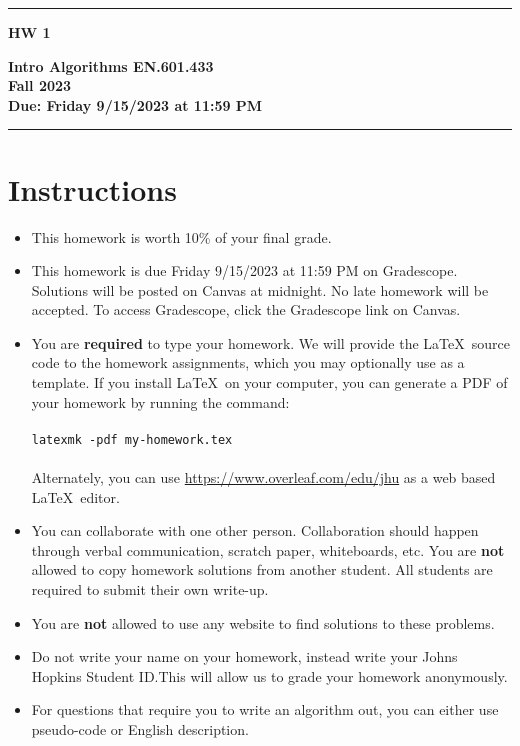 \documentclass[11pt]{article}
\begin{document}
\noindent\rule[2mm]{\textwidth}{1.5mm}
\noindent
\begin{minipage}{.3\textwidth}
  \vspace{-3mm}
  {\Huge\bf HW 1}
\end{minipage}\hfill\begin{minipage}{.5\textwidth}
\begin{flushright}
  {\bf Intro Algorithms EN.601.433 \\
  Fall 2023 \\
  Due: Friday 9/15/2023 at 11:59 PM}%
\vspace{3mm}
\end{flushright}
\end{minipage}
\noindent\rule{\textwidth}{1.5mm}

\section*{Instructions}

\begin{itemize}
\item This homework is worth 10\% of your final grade.

\item This homework is due Friday 9/15/2023 at 11:59 PM on
  Gradescope.  Solutions will be posted on Canvas at midnight.  No late homework will be accepted.  To access Gradescope, click the Gradescope link on Canvas.

\item You are \textbf{required} to type your homework.  We will
  provide the \LaTeX~source code to the homework assignments, which you may
  optionally use as a template.  If you install \LaTeX~on your computer, you can
  generate a PDF of
  your homework by running the command: \\
  \\
  \texttt{latexmk~-pdf~my-homework.tex} \\
  \\
  Alternately, you can use \url{https://www.overleaf.com/edu/jhu} as a web based
  \LaTeX~editor.

\item You can collaborate with one other person.
    Collaboration should happen through verbal communication, scratch paper,
    whiteboards, etc.  You are \textbf{not} allowed to copy homework
    solutions from another student.  All students are required to submit their
    own write-up.  
    
\item You are \textbf{not} allowed to use any website to find solutions to these problems.

\item Do not write your name on your homework, instead write your Johns Hopkins Student ID.\@ This will allow us to grade your homework anonymously.

\item For questions that require you to write an algorithm out, you can either use pseudo-code or English description.
\end{itemize}
\end{document}
